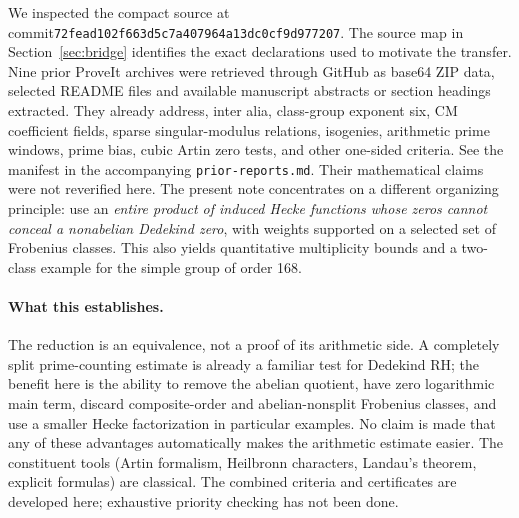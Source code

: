 \documentclass[11pt]{article}
\theoremstyle{remark}\newtheorem{remark}[theorem]{Remark}
\begin{document}
We inspected the compact source at commit\newline\nolinkurl{72fead102f663d5c7a407964a13dc0cf9d977207}. The source map in Section~\ref{sec:bridge} identifies the exact declarations used to motivate the transfer. Nine prior ProveIt archives \cite{proveit} were retrieved through GitHub as base64 ZIP data, selected README files and available manuscript abstracts or section headings extracted. They already address, inter alia, class-group exponent six, CM coefficient fields, sparse singular-modulus relations, isogenies, arithmetic prime windows, prime bias, cubic Artin zero tests, and other one-sided criteria. See the manifest in the accompanying \texttt{prior-reports.md}. Their mathematical claims were not reverified here. The present note concentrates on a different organizing principle: use an \emph{entire product of induced Hecke functions whose zeros cannot conceal a nonabelian Dedekind zero}, with weights supported on a selected set of Frobenius classes. This also yields quantitative multiplicity bounds and a two-class example for the simple group of order 168.

\paragraph{What this establishes.} The reduction is an equivalence, not a proof of its arithmetic side. A completely split prime-counting estimate is already a familiar test for Dedekind RH; the benefit here is the ability to remove the abelian quotient, have zero logarithmic main term, discard composite-order and abelian-nonsplit Frobenius classes, and use a smaller Hecke factorization in particular examples. No claim is made that any of these advantages automatically makes the arithmetic estimate easier. The constituent tools (Artin formalism, Heilbronn characters, Landau's theorem, explicit formulas) are classical. The combined criteria and certificates are developed here; exhaustive priority checking has not been done.
\end{document}
